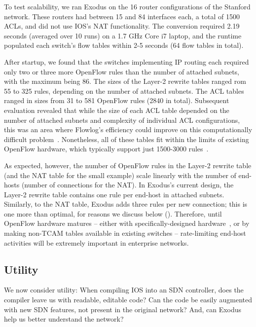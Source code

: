 To test scalability, we ran Exodus on the 16 router configurations of the Stanford
network.
%
These routers had between 15 and 84 interfaces each, a total of 1500 ACLs, and did
not use IOS's NAT functionality. The conversion required 2.19 seconds (averaged over
10 runs) on a 1.7 GHz Core i7 laptop, and the runtime
populated each switch's flow tables within 2-5 seconds (64 flow tables in total).

After startup, we found that the switches implementing IP routing each required only two or three more
OpenFlow rules than the number of attached subnets, with the maximum being 86.
The sizes of the Layer-2 rewrite tables ranged rom 55 to 325 rules, depending on the
number of attached subnets.
The ACL tables ranged in sizes from 31 to 581 OpenFlow rules (2840 in total).
Subsequent evaluation revealed that while the size of each ACL table depended on the
number of attached subnets and complexity of individual ACL configurations, this
was an area where Flowlog's efficiency could improve on this computationally difficult
problem~\cite{Applegate:2007compressing}.
Nonetheless, all of these tables fit within the limits of existing
OpenFlow hardware, which typically support just 1500-3000 rules~\cite{Rotsos:2012oflops}.

As expected, however, the number of OpenFlow rules in the Layer-2 rewrite table
(and the NAT table for the small example) scale linearly with the number of end-hosts
(number of connections for the NAT). In Exodus's current design, the Layer-2 rewrite
table contains one rule per end-host in attached subnets.
Similarly, to the NAT table, Exodus adds three rules per new connection; this is one
more than optimal, for reasons we discuss below ().
Therefore, until OpenFlow hardware matures -- either with specifically-designed hardware~\cite{Bosshart:2013ppipp-arxiv},
or by making non-TCAM tables available in existing switches -- rate-limiting end-host activities will
be extremely important in enterprise networks.

\subsection{Utility}
\label{sec:utility}

We now consider utility: When compiling IOS into an SDN
controller, does the compiler leave us with readable, editable code?
Can the code be easily augmented with new SDN features, not present in the
original network? And, can Exodus help us better understand the network?

